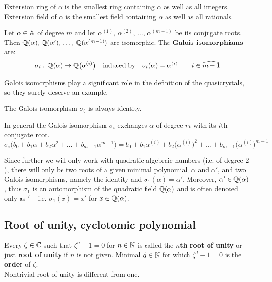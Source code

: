 \documentclass[text.tex]{subfiles}
\begin{document}
\begin{remark}
Extension ring of $\alpha$ is the smallest ring containing $\alpha$ as well as all integers. 
Extension field of $\alpha$ is the smallest field containing $\alpha$ as well as all rationals. 
\end{remark}

\begin{definition}
Let $\alpha\in\mathbb{A}$ of degree $m$ and let $\alpha^{(1)},\,\alpha^{(2)},\,\dots,\,\alpha^{(m-1)}$ be its conjugate roots. Then $\mathbb{Q}(\alpha),\, \mathbb{Q}(\alpha'),\,\dots,\, \mathbb{Q}(\alpha^{(m-1)})$ are isomorphic. The \textbf{Galois isomorphisms} are:
$$\sigma_i:\,\mathbb{Q}(\alpha)\to\mathbb{Q}\big(\alpha^{(i)}\big)\quad\text{induced by}\quad\sigma_i(\alpha) = \alpha^{(i)}\qquad i\in\widehat{m-1}$$
\end{definition}

Galois isomorphisms play a significant role in the definition of the quasicrystals, so they surely deserve an example. 

The Galois isomorphism $\sigma_0$ is always identity.

In general the Galois isomorphism $\sigma_i$ exchanges $\alpha$ of degree $m$ with its $i$th conjugate root. 
$$\sigma_i\big(b_0 + b_1\alpha + b_2\alpha^2 + \dots + b_{m-1}\alpha^{m-1}\big) = b_0 + b_1\alpha^{(i)} + b_2\big(\alpha^{(i)}\big)^2 + \dots + b_{m-1}\big(\alpha^{(i)}\big)^{m-1}$$

Since further we will only work with quadratic algebraic numbers (i.e. of degree $2$), there will only be two roots of a given minimal polynomial, $\alpha$ and $\alpha'$, and two Galois isomorphisms, namely the identity and $\sigma_1(\alpha) = \alpha'$. Moreover, $\alpha'\in\mathbb{Q}(\alpha)$, thus $\sigma_1$ is an automorphism of the quadratic field $\mathbb{Q}(\alpha)$ and is often denoted only as $'$ -- i.e. $\sigma_1(x) = x'$ for $x\in\mathbb{Q}(\alpha)$.

\subsection{Root of unity, cyclotomic polynomial}\label{sec_rootOfUnity}

\begin{definition}
Every $\zeta\in\mathbb{C}$ such that $\zeta^n-1=0$ for $n\in\mathbb{N}$ is called the \textbf{$n$th root of unity} or just \textbf{root of unity} if $n$ is not given. Minimal $d\in\mathbb{N}$ for which $\zeta^d-1=0$ is the \textbf{order} of $\zeta$. \\
Nontrivial root of unity is different from one. 
\end{definition}
\end{document}
